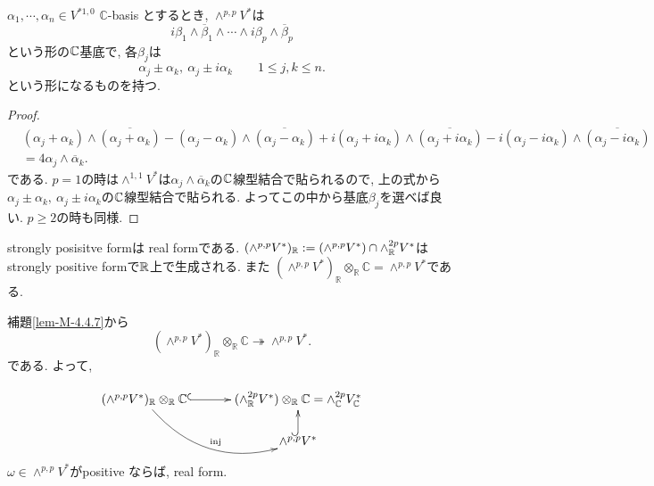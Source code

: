 \begin{tcolorbox}[mybox]
\begin{lem}
\label{lem-M-4.4.7}
\(\alpha_1,\cdots,\alpha_n\in V^{*1,0}\) \(\mathbb{C}\)-basis
とするとき, 
\(\wedge^{p,p}V^* \)は
\[
i\beta_1\wedge \overline{\beta}_1\wedge \cdots \wedge i\beta_p\wedge \overline{\beta}_p
\]
という形の$\mathbb{C}$基底で, 各\(\beta_j\)は
 \[\alpha_j\pm \alpha_k,\ \alpha_j\pm i\alpha_k\qquad 1\le j,k\le n.\]
という形になるものを持つ.
\end{lem}
\end{tcolorbox}
\begin{proof}
\begin{align*}
&(\alpha_j+\alpha_k)\wedge \overline{(\alpha_j+\alpha_k)}
-
(\alpha_j-\alpha_k)\wedge \overline{(\alpha_j-\alpha_k)}
+ i(\alpha_j+i\alpha_k)\wedge \overline{(\alpha_j+i\alpha_k)}
- i(\alpha_j-i\alpha_k)\wedge \overline{(\alpha_j-i\alpha_k)}
\\
&= 4\alpha_j\wedge \overline{\alpha}_k.
\end{align*}
である. 
$p=1$の時は\(\wedge^{1,1}V^* \)は$\alpha_j\wedge \overline{\alpha}_k$の$\mathbb{C}$線型結合で貼られるので, 上の式から$\alpha_j\pm \alpha_k,\ \alpha_j\pm i\alpha_k$の$\mathbb{C}$線型結合で貼られる. よってこの中から基底\(\beta_j\)を選べば良い. $p \ge 2$の時も同様.
\end{proof}


\begin{rem}
strongly posisitve formは real formである. 
$
(\wedge^{p,p}V^*)_{\mathbb{R}}:=(\wedge^{p,p}V^*)\cap \wedge_{\mathbb{R}}^{2p}V^*
$はstrongly positive formで$\mathbb{R}$上で生成される.
また
\((\wedge^{p,p}V^*)_{\mathbb{R}}\otimes_{\mathbb{R}}\mathbb{C}
=
\wedge^{p,p}V^*\)である. 

補題\ref{lem-M-4.4.7}から
\[
(\wedge^{p,p}V^*)_{\mathbb{R}}\otimes_{\mathbb{R}}\mathbb{C}
\twoheadrightarrow
\wedge^{p,p}V^*.
\]
である. よって, 

\[
\xymatrix@C=32pt@R=18pt{
(\wedge^{p,p}V^*)_{\mathbb{R}}\otimes_{\mathbb{R}}\mathbb{C}
\ar@{^{(}->}[r]
\ar@/_2pc/[dr]^{\mathrm{inj}}
&
(\wedge_{\mathbb{R}}^{2p}V^*)\otimes_{\mathbb{R}}\mathbb{C}
=
\wedge_{\mathbb{C}}^{2p}V_{\mathbb{C}}^*
\\
&
\wedge^{p,p}V^*
    \ar@{^{(}->}[u]
}
\]

\end{rem}


\begin{tcolorbox}[mybox]
\begin{lem}
\label{lem-M-4.4.8}
\(\omega\in \wedge^{p,p}V^*\)がpositive ならば, real form.
\end{lem}
\end{tcolorbox}

